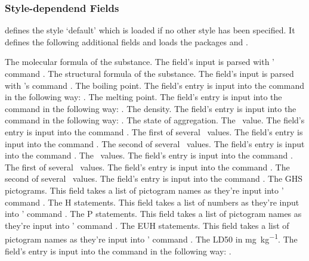 \documentclass[DIV10,toc=index,toc=bib]{cnpkgdoc}
\begin{document}
\subsubsection{Style-dependend Fields}
\substances defines the style `default' which is loaded if no other style has
been specified. It defines the following additional fields and loads the
packages  and .
\begin{beschreibung}
 \optional The molecular formula of the substance. The field's
   input is parsed with ' command
   .
 \optional The structural formula of the substance. The field's
   input is parsed with 's command .
 \optional The boiling point. The field's entry is input into
   the  command  in the following way:
   .
 \optional The melting point. The field's entry is input into
   the  command  in the following way:
   .
 \optional The density. The field's entry is input into
   the  command  in the following way:
   .
 \optional The state of aggregation.
 \optional The \pKa\ value. The field's entry is input into the
    command .
 \optional The first of several \pKa\ values. The field's entry is
   input into the  command .
 \optional The second of several \pKa\ values. The field's entry is
   input into the  command .
 \optional The \pKb\ values. The field's entry is input into the
    command .
 \optional The first of several \pKb\ values. The field's entry is
   input into the  command .
 \optional The second of several \pKb\ values. The field's entry is
   input into the  command .
 \optional The GHS pictograms. This field takes a list
   of pictogram names as they're input into ' command
   .
 \optional The H statements. This field takes a list
   of numbers as they're input into ' command
   .
 \optional The P statements. This field takes a list
   of pictogram names as they're input into ' command
   .
 \optional The EUH statements. This field takes a list
   of pictogram names as they're input into ' command
   .
 \optional The \ac{LD50} in \si{\milli\gram\per\kilo\gram}. The
   field's entry is input into the  command  in the
   following way: .
\end{beschreibung}
\end{document}
